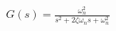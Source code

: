 \documentclass[preview]{standalone}
\begin{document}
\begin{align*}
G(s) = \frac{\omega_n^2}{s^2 + 2\zeta\omega_n s + \omega_n^2}
\end{align*}
\end{document}
